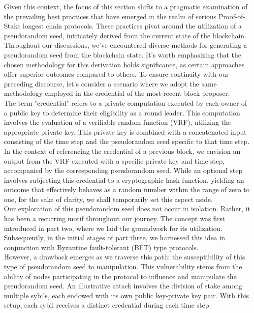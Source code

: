 Given this context, the focus of this section shifts to a pragmatic examination of the prevailing best practices that have emerged in the realm of serious Proof-of-Stake longest chain protocols. These practices pivot around the utilization of a pseudorandom seed, intricately derived from the current state of the blockchain. Throughout our discussions, we've encountered diverse methods for generating a pseudorandom seed from the blockchain state. It's worth emphasizing that the chosen methodology for this derivation holds significance, as certain approaches offer superior outcomes compared to others. To ensure continuity with our preceding discourse, let's consider a scenario where we adopt the same methodology employed in the credential of the most recent block proposer.\\
The term "credential" refers to a private computation executed by each owner of a public key to determine their eligibility as a round leader. This computation involves the evaluation of a verifiable random function (VRF), utilizing the appropriate private key. This private key is combined with a concatenated input consisting of the time step and the pseudorandom seed specific to that time step. In the context of referencing the credential of a previous block, we envision an output from the VRF executed with a specific private key and time step, accompanied by the corresponding pseudorandom seed. While an optional step involves subjecting this credential to a cryptographic hash function, yielding an outcome that effectively behaves as a random number within the range of zero to one, for the sake of clarity, we shall temporarily set this aspect aside.\\
Our exploration of this pseudorandom seed does not occur in isolation. Rather, it has been a recurring motif throughout our journey. The concept was first introduced in part two, where we laid the groundwork for its utilization. Subsequently, in the initial stages of part three, we harnessed this idea in conjunction with Byzantine fault-tolerant (BFT) type protocols.\\
However, a drawback emerges as we traverse this path: the susceptibility of this type of pseudorandom seed to manipulation. This vulnerability stems from the ability of nodes participating in the protocol to influence and manipulate the pseudorandom seed. An illustrative attack involves the division of stake among multiple sybils, each endowed with its own public key-private key pair. With this setup, each sybil receives a distinct credential during each time step.\\

